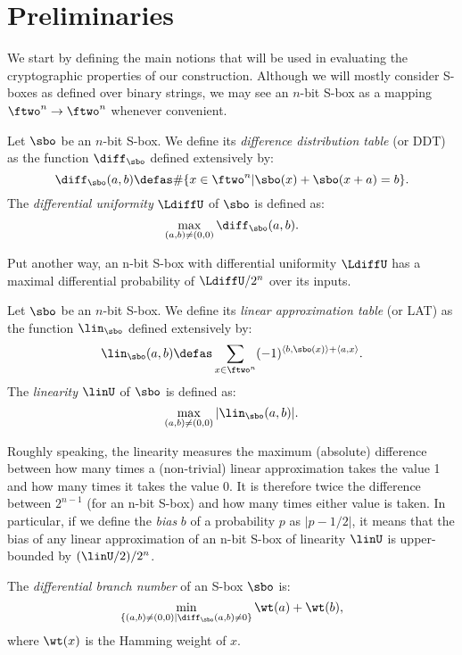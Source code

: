 \section{Preliminaries}

We start by defining the main notions that will be used in evaluating the cryptographic properties of our construction.
Although we will mostly consider S-boxes as defined over binary strings, we may see an $n$-bit S-box as a mapping
$\ftwo^n \rightarrow \ftwo^n$ whenever convenient.


\begin{defi}
Let $\sbo$ be an $n$-bit S-box. We define its
\emph{difference distribution table} (or DDT) as the function $\diff_{\sbo}$ defined extensively by:
\[
\diff_{\sbo}(a,b) \defas \#\{x \in \ftwo^n | \sbo(x) + \sbo(x + a) = b\}.
\]
The \emph{differential uniformity} $\LdiffU$ of $\sbo$ is defined as:
\[
\max_{(a,b) \neq (0,0)} \diff_{\sbo}(a,b).
\]
\end{defi}
Put another way, an n-bit S-box with differential uniformity $\LdiffU$ has a maximal differential probability
of $\LdiffU/2^n$ over its inputs.


\begin{defi}
Let $\sbo$ be an $n$-bit S-box. We define its
\emph{linear approximation table} (or LAT) as the function $\lin_{\sbo}$ defined extensively by:
\[
\lin_{\sbo}(a,b) \defas \sum_{x \in \ftwo^n} (-1)^{\langle b,\sbo(x)\rangle + \langle a, x\rangle}.
\]
The \emph{linearity} $\linU$ of $\sbo$ is defined as:
\[
\max_{(a,b) \neq (0,0)} |\lin_{\sbo}(a,b)|.
\]
\end{defi}
Roughly speaking, the linearity measures the maximum (absolute) difference between how many times a (non-trivial) linear approximation
takes the value 1 and how many times it takes the value 0. It is therefore twice the difference between $2^{n-1}$ (for an n-bit S-box)
and how many times either value is taken.
In particular, if we define the \emph{bias} $b$ of a probability $p$ as $|p - 1/2|$, it means that
the bias of any linear approximation of an n-bit S-box of linearity $\linU$ is upper-bounded by $(\linU/2)/2^n$.

\begin{defi}
The \emph{differential branch number} of an S-box $\sbo$ is:
\[
\min_{\{(a,b) \neq (0,0) | \diff_{\sbo}(a,b) \neq 0\}} \wt(a) + \wt(b),
\]
where $\wt(x)$ is the Hamming weight of $x$. 
\end{defi}

